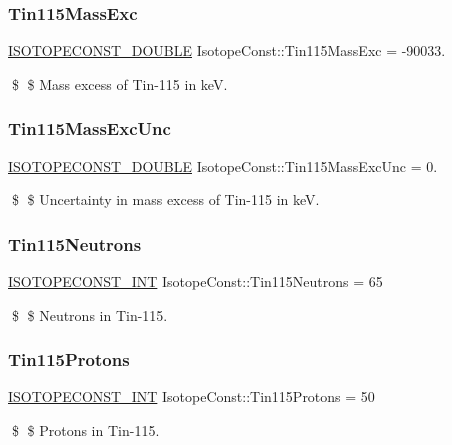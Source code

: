 \subsubsection{\texorpdfstring{Tin115\+Mass\+Exc}{Tin115MassExc}}
{\footnotesize\ttfamily \mbox{\hyperlink{group___isotope_const-_macros_ga8f45a7272ce02c0b4c65c44636ed719a}{I\+S\+O\+T\+O\+P\+E\+C\+O\+N\+S\+T\+\_\+\+D\+O\+U\+B\+LE}} Isotope\+Const\+::\+Tin115\+Mass\+Exc = -\/90033.}

\$ \$ Mass excess of Tin-\/115 in keV. \mbox{\label{group___isotope_const-_tin-_sn115_gaaeac9c75e7a2e81666f04f163246a56b}} 
\subsubsection{\texorpdfstring{Tin115\+Mass\+Exc\+Unc}{Tin115MassExcUnc}}
{\footnotesize\ttfamily \mbox{\hyperlink{group___isotope_const-_macros_ga8f45a7272ce02c0b4c65c44636ed719a}{I\+S\+O\+T\+O\+P\+E\+C\+O\+N\+S\+T\+\_\+\+D\+O\+U\+B\+LE}} Isotope\+Const\+::\+Tin115\+Mass\+Exc\+Unc = 0.}

\$ \$ Uncertainty in mass excess of Tin-\/115 in keV. \mbox{\label{group___isotope_const-_tin-_sn115_ga76ab11c19c65a3241ca15459eb73e7bf}} 
\subsubsection{\texorpdfstring{Tin115\+Neutrons}{Tin115Neutrons}}
{\footnotesize\ttfamily \mbox{\hyperlink{group___isotope_const-_macros_ga5f18360b3e99483a35c32d789e62621c}{I\+S\+O\+T\+O\+P\+E\+C\+O\+N\+S\+T\+\_\+\+I\+NT}} Isotope\+Const\+::\+Tin115\+Neutrons = 65}

\$ \$ Neutrons in Tin-\/115. \mbox{\label{group___isotope_const-_tin-_sn115_ga4450e975ad70068bf354b45d229708f5}} 
\subsubsection{\texorpdfstring{Tin115\+Protons}{Tin115Protons}}
{\footnotesize\ttfamily \mbox{\hyperlink{group___isotope_const-_macros_ga5f18360b3e99483a35c32d789e62621c}{I\+S\+O\+T\+O\+P\+E\+C\+O\+N\+S\+T\+\_\+\+I\+NT}} Isotope\+Const\+::\+Tin115\+Protons = 50}

\$ \$ Protons in Tin-\/115. 